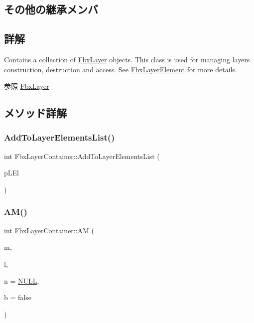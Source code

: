 \subsection*{その他の継承メンバ}


\subsection{詳解}
Contains a collection of \hyperlink{class_fbx_layer}{Fbx\+Layer} objects. This class is used for managing layers construction, destruction and access. See \hyperlink{class_fbx_layer_element}{Fbx\+Layer\+Element} for more details. 

\begin{DoxySeeAlso}{参照}
\hyperlink{class_fbx_layer}{Fbx\+Layer} 
\end{DoxySeeAlso}


\subsection{メソッド詳解}
\mbox{\label{class_fbx_layer_container_abceae8ff9bf083667013f1ec101d04ce}} 
\subsubsection{\texorpdfstring{Add\+To\+Layer\+Elements\+List()}{AddToLayerElementsList()}}
{\footnotesize\ttfamily int Fbx\+Layer\+Container\+::\+Add\+To\+Layer\+Elements\+List (\begin{DoxyParamCaption}\item[{\hyperlink{class_fbx_layer_element}{Fbx\+Layer\+Element} $\ast$}]{p\+L\+El }\end{DoxyParamCaption})}

\mbox{\label{class_fbx_layer_container_a273820824e7c6db2b40dabfb44c3ca5b}} 
\subsubsection{\texorpdfstring{A\+M()}{AM()}}
{\footnotesize\ttfamily int Fbx\+Layer\+Container\+::\+AM (\begin{DoxyParamCaption}\item[{void $\ast$}]{m,  }\item[{\hyperlink{fbxtypes_8h_ae9fb141d8158a730aa85ec5ff2ea3f6b}{Fbx\+U\+Int}}]{l,  }\item[{void $\ast$}]{n = {\ttfamily \hyperlink{fbxarch_8h_a070d2ce7b6bb7e5c05602aa8c308d0c4}{N\+U\+LL}},  }\item[{bool}]{b = {\ttfamily false} }\end{DoxyParamCaption})}

